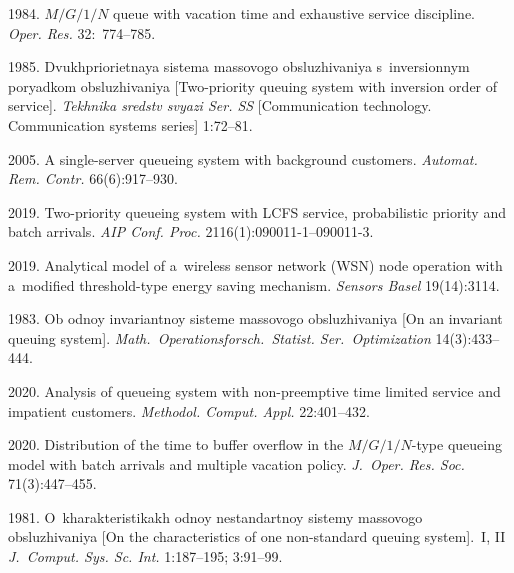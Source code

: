  \begin{multicols}{2}

\renewcommand{\bibname}{\protect\rmfamily References}

{\small\frenchspacing
 {%
 \begin{thebibliography}{99}
 1984.
${M/G/1/N}$ queue with vacation time and exhaustive service discipline.
\textit{Oper. Res.} 32:~774--785.

 1985.
Dvukhpriorietnaya sistema massovogo obsluzhivaniya 
s~inversionnym poryadkom obsluzhivaniya [Two-priority queuing 
system with inversion order of service].
\textit{Tekhnika sredstv svyazi Ser. SS} [Communication technology. 
Communication systems series] 1:72--81.

 2005.
A single-server queueing system with background customers.
\textit{Automat. Rem. Contr.} 66(6):917--930.

 2019. Two-priority queueing system with LCFS
service, probabilistic priority and batch
arrivals. \textit{AIP Conf. Proc.}  2116(1):090011-1--090011-3.

 2019.
Analytical model of a~wireless sensor network (WSN) node 
operation with a~modified threshold-type energy saving mechanism.
\textit{Sensors Basel} 19(14):3114.

 1983.
Ob odnoy invariantnoy sisteme massovogo obsluzhivaniya
[On an invariant queuing system].
\textit{Math.\ Operationsforsch.\ Statist. Ser.\ Optimization} 14(3):433--444.

 2020.
Analysis of queueing system with non-preemptive 
time limited service and impatient customers.
\textit{Methodol. Comput. Appl.} 22:401--432.

 2020. 
Distribution of the time to buffer overflow in the ${M/G/1/N}$-type 
queueing model with batch arrivals and multiple vacation policy. 
\textit{J.~Oper. Res. Soc.} 71(3):447--455.

 1981.
O~kharakteristikakh odnoy nestandartnoy sistemy massovogo obsluzhivaniya
[On the characteristics of one non-standard queuing system].~I, II
\textit{J.~Comput. Sys. Sc. Int.}
1:187--195; 3:91--99.


\end{thebibliography}}}
\end{multicols}
